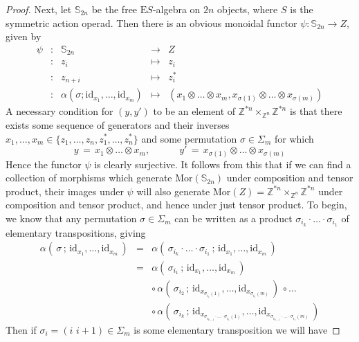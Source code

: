 \documentclass{amsbook} %
\newcommand{\id}{\textrm{id}}
\numberwithin{section}{chapter}
\begin{document}
\begin{proof}
Next, let $\mathbb{S}_{2n}$ be the free $\mathrm{E}S$-algebra on $2n$ objects, where $S$ is the symmetric action operad. Then there is an obvious monoidal functor $\psi \colon \mathbb{S}_{2n} \to Z$, given by
\[ \begin{array}{rcrcl}
			\psi & \colon & \mathbb{S}_{2n} & \to & Z \\
			 & \colon & z_i & \mapsto & z_i \\
			 & \colon & z_{n+i} & \mapsto & z_i^* \\
			 & \colon & \alpha(\sigma; \id_{x_1}, \ldots, \id_{x_m}) & \mapsto & (x_1 \otimes \ldots \otimes x_m, x_{\sigma(1)} \otimes \ldots \otimes x_{\sigma(m)})
		\end{array}
\]
A necessary condition for $(y, y')$ to be an element of $\mathbb{Z}^{\ast n} \times_{\mathbb{Z}^n} \mathbb{Z}^{\ast n}$ is that there exists some sequence of generators and their inverses $x_1, \ldots, x_m \in \{z_1, \ldots, z_n, z_1^*, \ldots, z_n^*\}$ and some permutation $\sigma \in \Sigma_m$ for which
\[ y \, = \, x_1 \otimes \ldots \otimes x_m, \quad \quad \quad y' \, = \, x_{\sigma(1)} \otimes \ldots \otimes x_{\sigma(m)} \]
Hence the functor $\psi$ is clearly surjective. It follows from this that if we can find a collection of morphisms which generate $\mathrm{Mor}(\mathbb{S}_{2n})$ under composition and tensor product, their images under $\psi$ will also generate $\mathrm{Mor}(Z) = \mathbb{Z}^{\ast n} \times_{\mathbb{Z}^n} \mathbb{Z}^{\ast n}$ under composition and tensor product, and hence under just tensor product. To begin, we know that any permutation $\sigma \in \Sigma_m$ can be written as a product $\sigma_{i_k} \cdot \ldots \cdot \sigma_{i_1}$ of elementary transpositions, giving
\[ \begin{array}{rlll}
			\alpha( \, \sigma \, ; \, \id_{x_1}, \ldots, \id_{x_m} \, ) & = & \alpha( \, \sigma_{i_k} \cdot \ldots \cdot \sigma_{i_1} \, ; \,  \id_{x_1}, \ldots, \id_{x_m} \, ) \\
			& = &  \alpha( \, \sigma_{i_1} \, ; \,  \id_{x_1}, \ldots, \id_{x_m} \, )  \\
			& & \circ \, \alpha( \, \sigma_{i_2} \, ; \,  \id_{x_{\sigma_{i_1}(1)}}, \ldots, \id_{x_{\sigma_{i_1}(m)}} \, ) \, \circ \ldots \\
			& & \circ \, \alpha( \, \sigma_{i_k} \, ; \,  \id_{x_{\sigma_{i_{k-1}} \cdot \ldots \cdot \sigma_{i_1}(1)}}, \ldots, \id_{x_{\sigma_{i_{k-1}} \cdot \ldots \cdot \sigma_{i_1}(m)}} \, )
		\end{array}
\]
Then if $\sigma_i = (i \, \, i+1) \in \Sigma_m$ is some elementary transposition we will have

\end{proof}
\end{document}
